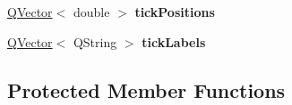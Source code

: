 \begin{DoxyCompactItemize}
\item 
\hyperlink{class_q_vector}{Q\+Vector}$<$ double $>$ {\bfseries tick\+Positions}\hypertarget{class_q_c_p_axis_painter_private_a354f0ff839da7c9105c8cba34c5154ce}{}\label{class_q_c_p_axis_painter_private_a354f0ff839da7c9105c8cba34c5154ce}

\item 
\hyperlink{class_q_vector}{Q\+Vector}$<$ Q\+String $>$ {\bfseries tick\+Labels}\hypertarget{class_q_c_p_axis_painter_private_a268cffb1555545f4889125f7b3532f92}{}\label{class_q_c_p_axis_painter_private_a268cffb1555545f4889125f7b3532f92}

\end{DoxyCompactItemize}
\subsection*{Protected Member Functions}
